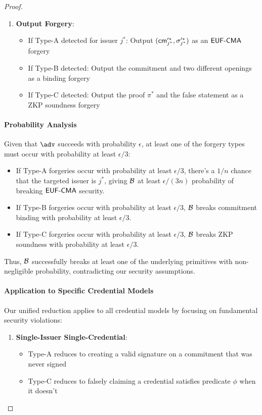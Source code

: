\begin{proof}
\begin{enumerate}
    \item \textbf{Output Forgery}:
    \begin{itemize}
        \item If Type-A detected for issuer $j^*$: Output $(\mathsf{cm}_{j^*}'^*, \sigma_{j^*}'^*)$ as an $\mathsf{EUF\text{-}CMA}$ forgery
        \item If Type-B detected: Output the commitment and two different openings as a binding forgery
        \item If Type-C detected: Output the proof $\pi^*$ and the false statement as a ZKP soundness forgery
    \end{itemize}
\end{enumerate}

\paragraph{Probability Analysis}
Given that $\adv$ succeeds with probability $\epsilon$, at least one of the forgery types must occur with probability at least $\epsilon/3$:

\begin{itemize}
    \item If Type-A forgeries occur with probability at least $\epsilon/3$, there's a $1/n$ chance that the targeted issuer is $j^*$, giving $\mathcal{B}$ at least $\epsilon/(3n)$ probability of breaking $\mathsf{EUF\text{-}CMA}$ security.
    
    \item If Type-B forgeries occur with probability at least $\epsilon/3$, $\mathcal{B}$ breaks commitment binding with probability at least $\epsilon/3$.
    
    \item If Type-C forgeries occur with probability at least $\epsilon/3$, $\mathcal{B}$ breaks ZKP soundness with probability at least $\epsilon/3$.
\end{itemize}

Thus, $\mathcal{B}$ successfully breaks at least one of the underlying primitives with non-negligible probability, contradicting our security assumptions.

\paragraph{Application to Specific Credential Models}
Our unified reduction applies to all credential models by focusing on fundamental security violations:

\begin{enumerate}
    \item \textbf{Single-Issuer Single-Credential}: 
    \begin{itemize}
        \item Type-A reduces to creating a valid signature on a commitment that was never signed
        \item Type-C reduces to falsely claiming a credential satisfies predicate $\phi$ when it doesn't
    \end{itemize}
    

\end{enumerate}
\end{proof}
